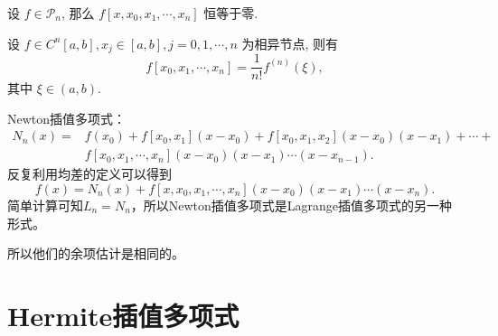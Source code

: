 \begin{corollary}
    设 $f \in \mathscr{P}_n$, 那么 $f\left[x, x_0, x_1, \cdots, x_n\right]$ 恒等于零.
\end{corollary}
\begin{proposition}
    设 $f \in C^n[a, b], x_j \in[a, b], j=0,1, \cdots, n$ 为相异节点, 则有
    $$
        f\left[x_0, x_1, \cdots, x_n\right]=\frac{1}{n!} f^{(n)}(\xi),
    $$
    其中 $\xi \in(a, b)$.
\end{proposition}
Newton插值多项式：
\begin{align}
    N_n(x)= & f\left(x_0\right)+f\left[x_0, x_1\right]\left(x-x_0\right)+f\left[x_0, x_1, x_2\right]\left(x-x_0\right)\left(x-x_1\right)+\cdots+ \\
            & f\left[x_0, x_1, \cdots, x_n\right]\left(x-x_0\right)\left(x-x_1\right) \cdots\left(x-x_{n-1}\right) .
\end{align}
反复利用均差的定义可以得到
\[
    f(x)=N_n(x)+f\left[x, x_0, x_1, \cdots, x_n\right]\left(x-x_0\right)\left(x-x_1\right) \cdots\left(x-x_n\right) .
\]
简单计算可知$L_n=N_n$，所以Newton插值多项式是Lagrange插值多项式的另一种形式。

所以他们的余项估计是相同的。
\section{Hermite插值多项式}

